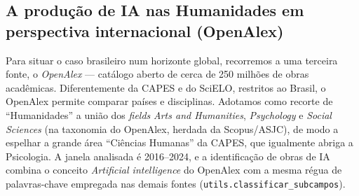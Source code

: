 %

\subsection{A produção de IA nas Humanidades em perspectiva internacional (OpenAlex)}

Para situar o caso brasileiro num horizonte global, recorremos a uma terceira
fonte, o \textit{OpenAlex} --- catálogo aberto de cerca de 250 milhões de obras
acadêmicas. Diferentemente da CAPES e do SciELO, restritos ao Brasil,
o OpenAlex permite comparar países e disciplinas. Adotamos como recorte de
``Humanidades'' a união dos \textit{fields} \textit{Arts and Humanities},
\textit{Psychology} e \textit{Social Sciences} (na taxonomia do OpenAlex,
herdada da Scopus/ASJC), de modo a espelhar a grande área ``Ciências Humanas''
da CAPES, que igualmente abriga a Psicologia. A janela analisada é
2016--2024, e a identificação de obras de IA combina o conceito
\textit{Artificial intelligence} do OpenAlex com a mesma régua de palavras-chave
empregada nas demais fontes (\texttt{utils.classificar\_subcampos}).

